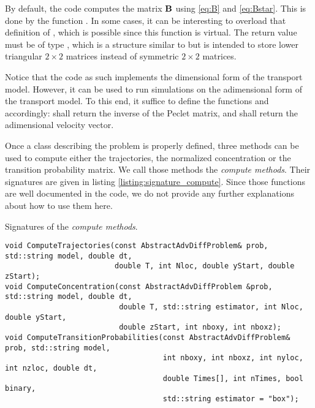 By default, the code computes the matrix $\mathbf B$ using \eqref{eq:B} and \eqref{eq:Bstar}. This is done by the function . In some cases, it can be interesting to overload that definition of , which is possible since this function is virtual. The return value must be of type , which is a structure similar to  but is intended to store lower triangular $2\times2$ matrices instead of symmetric $2\times2$ matrices.

Notice that the code as such implements the dimensional form of the transport model. However, it can be used to run simulations on the adimensional form of the transport model. To this end, it suffice to define the functions  and  accordingly:  shall return the inverse of the Peclet matrix, and  shall return the adimensional velocity vector.

Once a class describing the problem is properly defined, three methods can be used to compute either the trajectories, the normalized concentration or the transition probability matrix. We call those methods the \textit{compute methods}. Their signatures are given in listing \ref{listing:signature_compute}. Since those functions are well documented in the code, we do not provide any further explanations about how to use them here.
\begin{listing}[ht!]
\caption{Signatures of the \textit{compute methods}.}
\label{listing:signature_compute}
\begin{verbatim}
void ComputeTrajectories(const AbstractAdvDiffProblem& prob, std::string model, double dt,
						 double T, int Nloc, double yStart, double zStart);
void ComputeConcentration(const AbstractAdvDiffProblem &prob, std::string model, double dt,
						  double T, std::string estimator, int Nloc, double yStart,
						  double zStart, int nboxy, int nboxz);
void ComputeTransitionProbabilities(const AbstractAdvDiffProblem& prob, std::string model,
									int nboxy, int nboxz, int nyloc, int nzloc, double dt,
									double Times[], int nTimes, bool binary,
									std::string estimator = "box");
\end{verbatim}
\end{listing}

